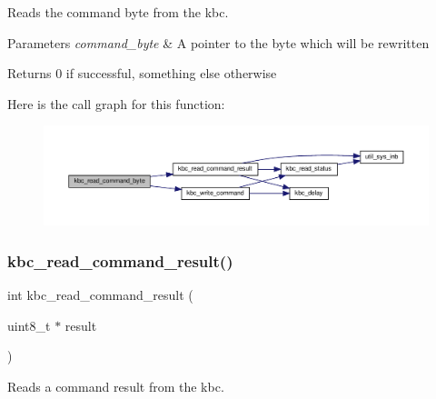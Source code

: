 Reads the command byte from the kbc. 


\begin{DoxyParams}{Parameters}
{\em command\+\_\+byte} & A pointer to the byte which will be rewritten \\
\hline
\end{DoxyParams}
\begin{DoxyReturn}{Returns}
0 if successful, something else otherwise 
\end{DoxyReturn}
Here is the call graph for this function\+:\nopagebreak
\begin{figure}[H]
\begin{center}
\leavevmode
\includegraphics[width=350pt]{group__kbc_gadc6d5fbf9c3a43d168962776591ac75b_cgraph}
\end{center}
\end{figure}
\mbox{\label{group__kbc_ga65f11cca39a73154ab68dabac8b12683}} 
\subsubsection{\texorpdfstring{kbc\+\_\+read\+\_\+command\+\_\+result()}{kbc\_read\_command\_result()}}
{\footnotesize\ttfamily int kbc\+\_\+read\+\_\+command\+\_\+result (\begin{DoxyParamCaption}\item[{uint8\+\_\+t $\ast$}]{result }\end{DoxyParamCaption})}



Reads a command result from the kbc. 



